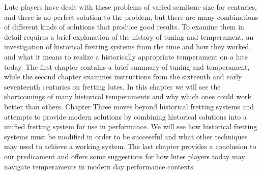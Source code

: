 Lute players have dealt with these problems of varied semitone size for centuries, and
there is no perfect solution to the problem, but there are many combinations of
different kinds of solutions that produce good results. To examine them in detail
requires a brief explanation of the history of tuning and temperament, an investigation
of historical fretting systems from the time and how they worked, and what it means to
realize a historically appropriate temperament on a lute today.  The first chapter
contains a brief summary of tuning and temperament, while the second chapter examines
instructions from the sixteenth and early seventeenth centuries on fretting lutes. In
this chapter we will see the shortcomings of many historical temperaments and why which
ones could work better than others. Chapter Three moves beyond historical fretting
systems and attempts to provide modern solutions by combining historical solutions into
a unified fretting system for use in performance.  We will see how historical fretting
systems must be modified in order to be successful and what other techniques may used
to achieve a working system. The last chapter provides a conclusion to our predicament
and offers some suggestions for how lutes players today may navigate temperaments in
modern day performance contexts. \autocite[130]{RD:1}
